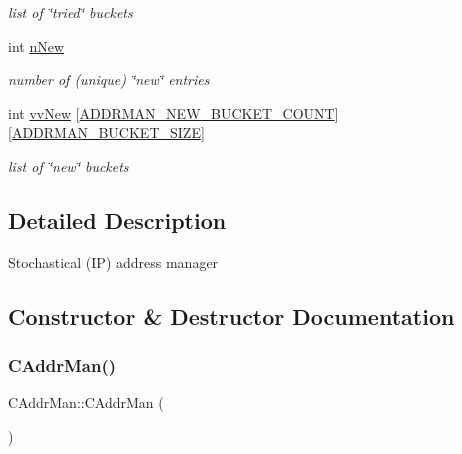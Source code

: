 \begin{DoxyCompactItemize}
\begin{DoxyCompactList}\small\item\em list of \char`\"{}tried\char`\"{} buckets \end{DoxyCompactList}\item 
int \mbox{\hyperlink{class_c_addr_man_a469f5f8e9ac527812338d7894b784986}{n\+New}}
\begin{DoxyCompactList}\small\item\em number of (unique) \char`\"{}new\char`\"{} entries \end{DoxyCompactList}\item 
int \mbox{\hyperlink{class_c_addr_man_afb2dcfcd27aedab01f5259980f322fa8}{vv\+New}} \mbox{[}\mbox{\hyperlink{addrman_8h_a74a626eb1dbb8e307a413e86493cd510}{A\+D\+D\+R\+M\+A\+N\+\_\+\+N\+E\+W\+\_\+\+B\+U\+C\+K\+E\+T\+\_\+\+C\+O\+U\+NT}}\mbox{]}\mbox{[}\mbox{\hyperlink{addrman_8h_a3499731a6c89e164cf74b68be2be0a84}{A\+D\+D\+R\+M\+A\+N\+\_\+\+B\+U\+C\+K\+E\+T\+\_\+\+S\+I\+ZE}}\mbox{]}
\begin{DoxyCompactList}\small\item\em list of \char`\"{}new\char`\"{} buckets \end{DoxyCompactList}\end{DoxyCompactItemize}


\subsection{Detailed Description}
Stochastical (IP) address manager 

\subsection{Constructor \& Destructor Documentation}
\mbox{\label{class_c_addr_man_ad9179d1c36c2ea3492e221576f340d33}} 
\subsubsection{\texorpdfstring{C\+Addr\+Man()}{CAddrMan()}}
{\footnotesize\ttfamily C\+Addr\+Man\+::\+C\+Addr\+Man (\begin{DoxyParamCaption}{ }\end{DoxyParamCaption})\hspace{0.3cm}{\ttfamily [inline]}}

